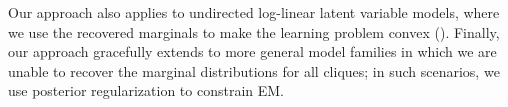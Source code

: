 Our approach also applies to undirected log-linear latent variable
  models, where we use the recovered marginals to make the learning
  problem convex ().
Finally, our approach gracefully extends to more general model families
  in which we are unable to recover the marginal distributions for all
  cliques; in such scenarios, we use posterior regularization to constrain
  EM. 


